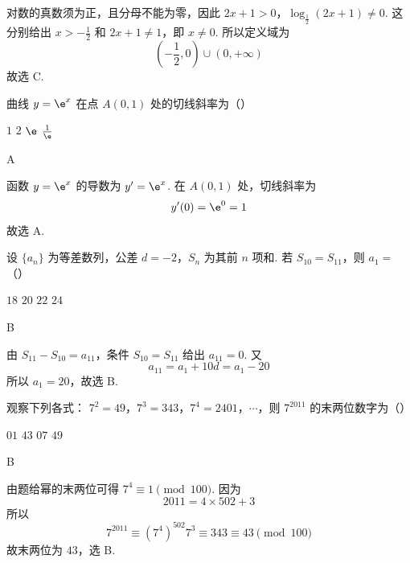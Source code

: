 \begin{solution}
对数的真数须为正，且分母不能为零，因此
\(2x+1>0\)，\(\log_{\frac{1}{2}}(2x+1)\ne0\).
这分别给出 \(x>-\frac12\) 和 \(2x+1\ne1\)，即 \(x\ne0\). 所以定义域为
\[
\left(-\frac12,0\right)\cup(0,+\infty)
\]
故选 C.
\end{solution}

\begin{problem}
曲线 \( y = \e^{x} \) 在点 \( A(0,1) \) 处的切线斜率为（\quad）

\choices
    {\(1\)}
    {\(2\)}
    {\(\e\)}
    {\(\frac{1}{\e}\)}
\end{problem}

\begin{answer}
A
\end{answer}

\begin{solution}
函数 \(y=\e^x\) 的导数为 \(y'=\e^x\). 在 \(A(0,1)\) 处，切线斜率为
\[
y'(0)=\e^0=1
\]
故选 A.
\end{solution}

\begin{problem}
设 \(\{a_{n}\}\) 为等差数列，公差 \(d = -2\)，\(S_{n}\) 为其前 \(n\) 项和. 若 \(S_{10} = S_{11}\)，则 \(a_{1} =\)（\quad）

\choices
    {\(18\)}
    {\(20\)}
    {\(22\)}
    {\(24\)}
\end{problem}

\begin{answer}
B
\end{answer}

\begin{solution}
由 \(S_{11}-S_{10}=a_{11}\)，条件 \(S_{10}=S_{11}\) 给出 \(a_{11}=0\). 又
\[
a_{11}=a_1+10d=a_1-20
\]
所以 \(a_1=20\)，故选 B.
\end{solution}

\begin{problem}
观察下列各式： \(7^{2} = 49\)，\(7^{3} = 343\)，\(7^{4} = 2401\)，\(\cdots\)，则 \(7^{2011}\) 的末两位数字为（\quad）

\choices
    {\(01\)}
    {\(43\)}
    {\(07\)}
    {\(49\)}
\end{problem}

\begin{answer}
B
\end{answer}

\begin{solution}
由题给幂的末两位可得 \(7^4\equiv1\pmod {100}\). 因为
\[
2011=4\times502+3
\]
所以
\[
7^{2011}\equiv(7^4)^{502}7^3\equiv343\equiv43\pmod {100}
\]
故末两位为 \(43\)，选 B.
\end{solution}

